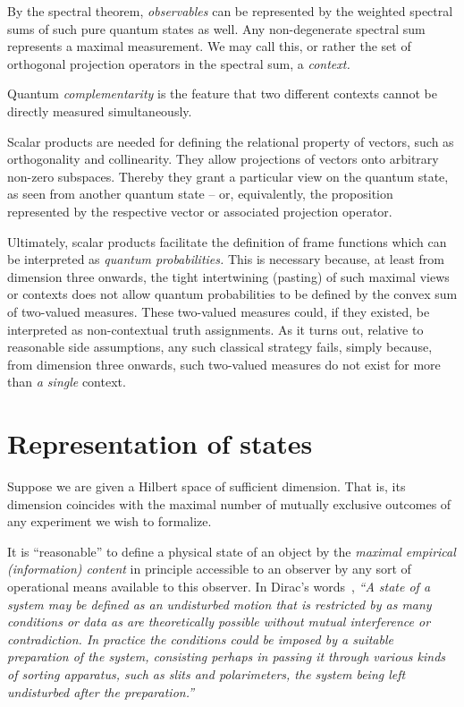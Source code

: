 By the spectral theorem, {\em observables} can be represented by the weighted spectral sums of such pure quantum states as well.
Any non-degenerate spectral sum represents a maximal measurement.
We may call this, or rather the set of  orthogonal projection operators in the spectral sum, a {\em context.}

Quantum {\em complementarity} is the feature that two different contexts cannot be directly measured simultaneously.

Scalar products are needed for defining the relational property of vectors, such as orthogonality and collinearity.
They allow projections of vectors onto arbitrary non-zero subspaces.
Thereby they grant a particular view on the quantum state, as seen from another quantum state -- or, equivalently, the proposition represented by
the respective vector or associated projection operator.


Ultimately, scalar products facilitate the definition of frame functions which can be interpreted as {\em quantum probabilities.}
This is necessary because, at least from dimension three onwards, the tight intertwining (pasting) of such maximal views or contexts
does not allow quantum probabilities to be defined by the convex sum of two-valued measures.
These two-valued measures could, if they existed, be interpreted as non-contextual truth assignments.
As it turns out, relative to reasonable side assumptions, any such classical strategy fails,
simply because, from dimension three onwards, such two-valued measures do not exist for more than {\em a single} context.



\section{Representation of states}
\label{2016-pu-book-chapter-qm-ros}

Suppose we are given a Hilbert space of sufficient dimension.
That is, its dimension coincides with the maximal number of mutually
exclusive outcomes of any experiment we wish to formalize.

It is ``reasonable'' to define  a physical state of an object
by the {\em maximal empirical (information) content}
in principle accessible to an observer
by any sort of operational means available to this observer.
In Dirac's words~\cite[pp.~11,12]{dirac},
{\em ``A state of a system may be defined as an undisturbed motion that
is restricted by as many conditions or data as are theoretically
possible without mutual interference or contradiction. In practice
the conditions could be imposed by a suitable preparation of the
system, consisting perhaps in passing it through various kinds of
sorting apparatus, such as slits and polarimeters, the system being
left undisturbed after the preparation.''}

